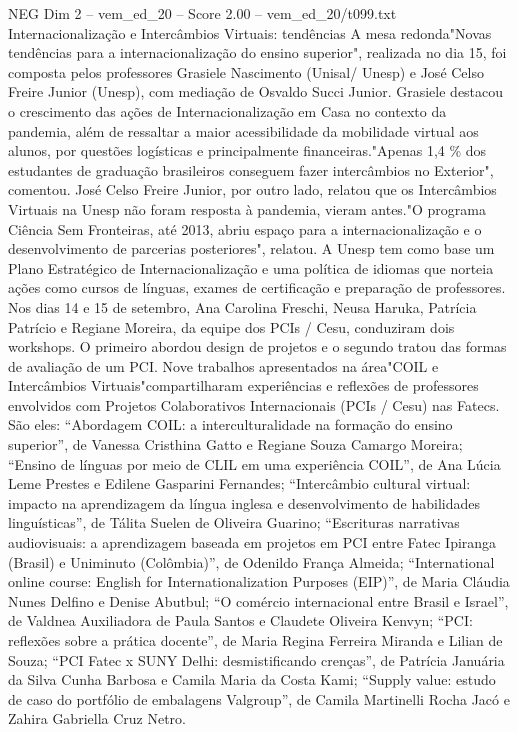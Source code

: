 \begin{textsample}{NEG Dim 2 – vem\_ed\_20 – Score 2.00 – vem\_ed\_20/t099.txt}  \label{ex:f2_neg_087}
Internacionalização e Intercâmbios Virtuais: tendências A mesa redonda"Novas tendências para a internacionalização do ensino superior", realizada no dia 15, foi composta pelos professores Grasiele Nascimento (Unisal/ Unesp) e José Celso Freire Junior (Unesp), com mediação de Osvaldo Succi Junior.
Grasiele destacou o crescimento das ações de Internacionalização em Casa no contexto da pandemia, além de ressaltar a maior acessibilidade da mobilidade virtual aos alunos, por questões logísticas e principalmente financeiras."Apenas 1,4 \% dos estudantes de graduação brasileiros conseguem fazer intercâmbios no Exterior", comentou.
José Celso Freire Junior, por outro lado, relatou que os Intercâmbios Virtuais na Unesp não foram resposta à pandemia, vieram antes."O programa Ciência Sem Fronteiras, até 2013, abriu espaço para a internacionalização e o desenvolvimento de parcerias posteriores", relatou.
A Unesp tem como base um Plano Estratégico de Internacionalização e uma política de idiomas que norteia ações como cursos de línguas, exames de certificação e preparação de professores.
Nos dias 14 e 15 de setembro, Ana Carolina Freschi, Neusa Haruka, Patrícia Patrício e Regiane Moreira, da equipe dos PCIs / Cesu, conduziram dois workshops.
O primeiro abordou design de projetos e o segundo tratou das formas de avaliação de um PCI.
Nove trabalhos apresentados na área"COIL e Intercâmbios Virtuais"compartilharam experiências e reflexões de professores envolvidos com Projetos Colaborativos Internacionais (PCIs / Cesu) nas Fatecs.
São eles: “Abordagem COIL: a interculturalidade na formação do ensino superior”, de Vanessa Cristhina Gatto e Regiane Souza Camargo Moreira; “Ensino de línguas por meio de CLIL em uma experiência COIL”, de Ana Lúcia Leme Prestes e Edilene Gasparini Fernandes; “Intercâmbio cultural virtual: impacto na aprendizagem da língua inglesa e desenvolvimento de habilidades linguísticas”, de Tálita Suelen de Oliveira Guarino; “Escrituras narrativas audiovisuais: a aprendizagem baseada em projetos em PCI entre Fatec Ipiranga (Brasil) e Uniminuto (Colômbia)”, de Odenildo França Almeida; “International online course: English for Internationalization Purposes (EIP)”, de Maria Cláudia Nunes Delfino e Denise Abutbul; “O comércio internacional entre Brasil e Israel”, de Valdnea Auxiliadora de Paula Santos e Claudete Oliveira Kenvyn; “PCI: reflexões sobre a prática docente”, de Maria Regina Ferreira Miranda e Lilian de Souza; “PCI Fatec x SUNY Delhi: desmistificando crenças”, de Patrícia Januária da Silva Cunha Barbosa e Camila Maria da Costa Kami; “Supply value: estudo de caso do portfólio de embalagens Valgroup”, de Camila Martinelli Rocha Jacó e Zahira Gabriella Cruz Netro.

\end{textsample}
